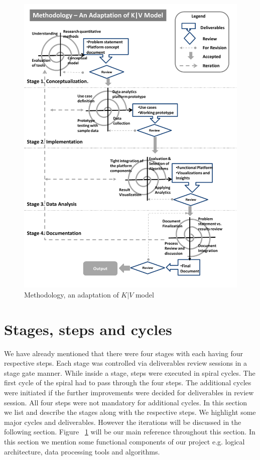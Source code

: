  \begin{figure}[pH]
   \begin{center}
     \includegraphics[width=\textwidth]{images/kv_method.pdf}
     \caption{Methodology, an adaptation of \(K|V\) model}
     \label{fig:kv}
   \end{center}
 \end{figure} 
\section{Stages, steps and cycles}\label{stages} 
We have already mentioned that there were four stages with each having four respective steps. Each stage was controlled via deliverables review sessions in a stage gate manner. While inside a stage, steps were executed in spiral cycles. The first cycle of the spiral had to pass through the four steps. The additional cycles were initiated if the further improvements were decided for deliverables in review session. All four steps were not mandatory for additional cycles. In this section we list and describe the stages along with the respective steps. We highlight some major cycles and deliverables. However the iterations will be discussed in the following section. Figure ~\ref{fig:kv} will be our main reference throughout this section. In this section we mention some functional components of our project e.g. logical architecture, data processing tools and algorithms. 
